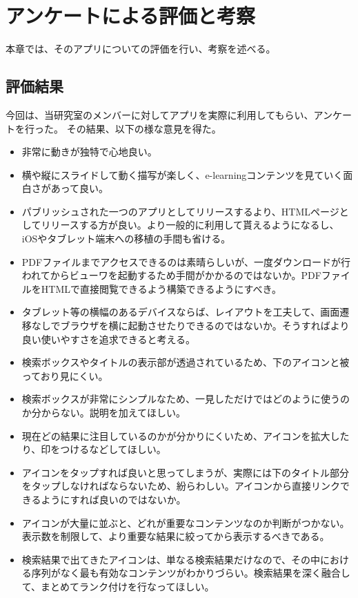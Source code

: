 \chapter{アンケートによる評価と考察}
\label{chap:result}

本章では、そのアプリについての評価を行い、考察を述べる。

\section{評価結果}
今回は、当研究室のメンバーに対してアプリを実際に利用してもらい、アンケートを行った。
その結果、以下の様な意見を得た。
\begin{itemize}
\item 非常に動きが独特で心地良い。
\item 横や縦にスライドして動く描写が楽しく、e-learningコンテンツを見ていく面白さがあって良い。
\item パブリッシュされた一つのアプリとしてリリースするより、HTMLページとしてリリースする方が良い。より一般的に利用して貰えるようになるし、iOSやタブレット端末への移植の手間も省ける。
\item PDFファイルまでアクセスできるのは素晴らしいが、一度ダウンロードが行われてからビューワを起動するため手間がかかるのではないか。PDFファイルをHTMLで直接閲覧できるよう構築できるようにすべき。
\item タブレット等の横幅のあるデバイスならば、レイアウトを工夫して、画面遷移なしでブラウザを横に起動させたりできるのではないか。そうすればより良い使いやすさを追求できると考える。
\item 検索ボックスやタイトルの表示部が透過されているため、下のアイコンと被っており見にくい。
\item 検索ボックスが非常にシンプルなため、一見しただけではどのように使うのか分からない。説明を加えてほしい。
\item 現在どの結果に注目しているのかが分かりにくいため、アイコンを拡大したり、印をつけるなどしてほしい。
\item アイコンをタップすれば良いと思ってしまうが、実際には下のタイトル部分をタップしなければならないため、紛らわしい。アイコンから直接リンクできるようにすれば良いのではないか。
\item アイコンが大量に並ぶと、どれが重要なコンテンツなのか判断がつかない。表示数を制限して、より重要な結果に絞ってから表示するべきである。
\item 検索結果で出てきたアイコンは、単なる検索結果だけなので、その中における序列がなく最も有効なコンテンツがわかりづらい。検索結果を深く融合して、まとめてランク付けを行なってほしい。

\end{itemize}
